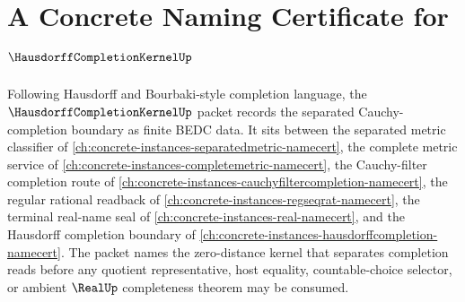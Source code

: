 \chapter{A Concrete Naming Certificate for $\HausdorffCompletionKernelUp$}
\label{ch:concrete-instances-hausdorff-completion-kernel-namecert}

Following Hausdorff and Bourbaki-style completion language, the $\HausdorffCompletionKernelUp$ packet records the separated Cauchy-completion boundary as finite BEDC data. It sits between the separated metric classifier of \autoref{ch:concrete-instances-separatedmetric-namecert}, the complete metric service of \autoref{ch:concrete-instances-completemetric-namecert}, the Cauchy-filter completion route of \autoref{ch:concrete-instances-cauchyfiltercompletion-namecert}, the regular rational readback of \autoref{ch:concrete-instances-regseqrat-namecert}, the terminal real-name seal of \autoref{ch:concrete-instances-real-namecert}, and the Hausdorff completion boundary of \autoref{ch:concrete-instances-hausdorffcompletion-namecert}. The packet names the zero-distance kernel that separates completion reads before any quotient representative, host equality, countable-choice selector, or ambient $\RealUp$ completeness theorem may be consumed.

